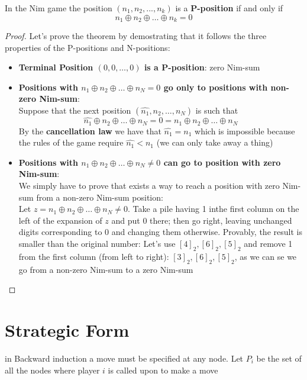 \documentclass[../main.tex]{subfiles}
\begin{document}
\begin{theorem}
    In the Nim game the position $(n_1,n_2,...,n_k)$ is a \textbf{P-position} if and only if
    \begin{equation*}
        n_1 \oplus n_2 \oplus \ldots \oplus n_k = 0
    \end{equation*}
\end{theorem}
\begin{proof}
    Let's prove the theorem by demostrating that it follows the three properties of the P-positions and N-positions:
    \begin{itemize}
        \item \textbf{Terminal Position $(0,0, \ldots, 0)$ is a P-position}: zero Nim-sum
        \item \textbf{Positions with $n_1 \oplus n_2 \oplus \ldots \oplus n_N = 0$ go only to positions with non-zero Nim-sum}:\\
              Suppose that the next position $(\hat{n_1}, n_2, \ldots, n_N)$ is such that
              \begin{equation*}
                  \hat{n_1} \oplus n_2 \oplus \ldots \oplus n_N = 0 = n_1 \oplus n_2 \oplus \ldots \oplus n_N
              \end{equation*}
              By the \textbf{cancellation law} we have that $\hat{n_1} = n_1$ which is impossible because the rules of the game require $\hat{n_1} < n_1$ (we can only take away a thing)
        \item \textbf{Positions with $n_1 \oplus n_2 \oplus \ldots \oplus n_N \neq 0$ can go to position with zero Nim-sum}:\\
              We simply have to prove that exists a way to reach a position with zero Nim-sum from a non-zero Nim-sum position:\\
              Let $z = n_1 \oplus n_2 \oplus \ldots \oplus n_N \neq 0$. Take a pile having 1 inthe first column on the left of the expansion of $z$ and put $0$ there; then go right, leaving unchanged digits corresponding to $0$ and changing them otherwise. Provably, the result is smaller than the original number: Let's use $[4]_2, [6]_2, [5]_2$ and remove 1 from the first column (from left to right): $[3]_2, [6]_2, [5]_2$, as we can se we go from a non-zero Nim-sum to a zero Nim-sum
    \end{itemize}
\end{proof}

\section{Strategic Form}
in Backward induction a move must be specified at any node. Let $P_i$ be the set of all the nodes where player $i$ is called upon to make a move
\end{document}
